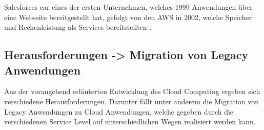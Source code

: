 Salesforces ear eines der ersten Unternehmen, welches 1999 Anwendungen über eine Webseite bereitgestellt hat,
gefolgt von den \ac{AWS} in 2002, welche Speicher und Rechenleistung als Services bereitstellten \cite[Vgl.][S. 17f]{Srivastava2018}.

\pagebreak

\subsection{Herausforderungen -> Migration von Legacy Anwendungen}

Aus der vorangehend erläuterten Entwicklung des Cloud Computing ergeben sich verschiedene Herausforderungen.
Darunter fällt unter anderem die Migration von Legacy Anwendungen zu Cloud Anwendungen, welche gegeben durch die verschiedenen Service Level
auf unterschiedlichen Wegen realisiert werden kann.